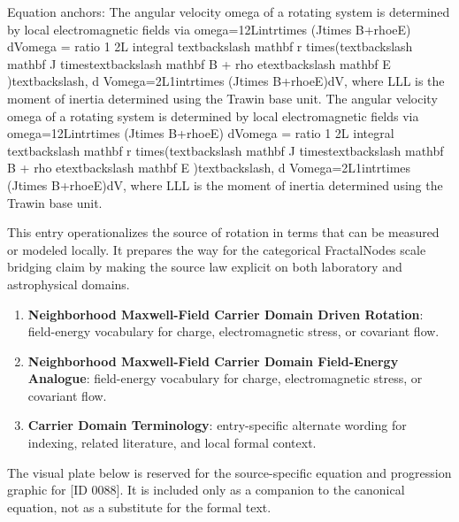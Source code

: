 Equation anchors: The angular velocity omega of a rotating system is determined by local electromagnetic fields via omega=12Lintrtimes (Jtimes B+rhoeE) dVomega = ratio 1 2L integral textbackslash mathbf r times(textbackslash mathbf J timestextbackslash mathbf B + rho etextbackslash mathbf E )textbackslash, d Vomega=2L1intrtimes (Jtimes B+rhoeE)dV, where LLL is the moment of inertia determined using the Trawin base unit. The angular velocity omega of a rotating system is determined by local electromagnetic fields via omega=12Lintrtimes (Jtimes B+rhoeE) dVomega = ratio 1 2L integral textbackslash mathbf r times(textbackslash mathbf J timestextbackslash mathbf B + rho etextbackslash mathbf E )textbackslash, d Vomega=2L1intrtimes (Jtimes B+rhoeE)dV, where LLL is the moment of inertia determined using the Trawin base unit.

This entry operationalizes the source of rotation in terms that can be measured or modeled locally. It prepares the way for the categorical FractalNodes scale bridging claim by making the source law explicit on both laboratory and astrophysical domains.
\endgroup

\begingroup\footnotesize\sloppy
\begin{enumerate}[leftmargin=1.35em,itemsep=1pt,topsep=1pt,parsep=0pt]
\item \textbf{Neighborhood Maxwell-Field Carrier Domain Driven Rotation}: field-energy vocabulary for charge, electromagnetic stress, or covariant flow.
\item \textbf{Neighborhood Maxwell-Field Carrier Domain Field-Energy Analogue}: field-energy vocabulary for charge, electromagnetic stress, or covariant flow.
\item \textbf{Carrier Domain Terminology}: entry-specific alternate wording for indexing, related literature, and local formal context.
\end{enumerate}
\endgroup

\begingroup\footnotesize\sloppy
The visual plate below is reserved for the source-specific equation and progression graphic for [ID 0088]. It is included only as a companion to the canonical equation, not as a substitute for the formal text.
\par\endgroup
\ifTZPDarkEdition
{}
\fi

